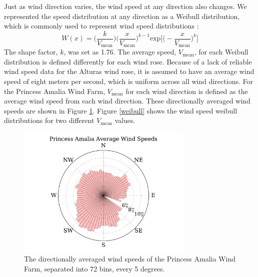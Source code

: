 Just as wind direction varies, the wind speed at any direction also changes. We represented the speed distribution at any direction as a Weibull distribution, which is commonly used to represent wind speed distributions \cite{justus1978methods,rehman1994weibull,dorvlo2002estimating}: 
\begin{equation}
W(x) = \Big(\frac{k}{V_{\text{mean}}}\Big)\Big(\frac{x}{V_{\text{mean}}}\Big)^{k-1}\text{exp}\Big[\Big(-\frac{x}{V_{\text{mean}}}\Big)^k\Big]
\end{equation}
The shape factor, $k$, was set as 1.76. The average speed, $V_{\text{mean}}$, for each Weibull distribution is defined differently for each wind rose.
Because of a lack of reliable wind speed data for the Alturas wind rose, it is assumed to have an average wind speed of eight meters per second, which is uniform across all wind directions. For the Princess Amalia Wind Farm, $V_{\text{mean}}$ for each wind direction is defined as the average wind speed from each wind direction. These directionally averaged wind speeds are shown in Figure \ref{amalia_speeds}. Figure \ref{weibull} shows the wind speed weibull distributions for two different $V_{\text{mean}}$ values. 
\begin{figure}[htbp]
  \centering
  \includegraphics[width=0.75\textwidth]{Figures/amalia_speeds.pdf}
  \caption{\label{amalia_speeds} The directionally averaged wind speeds of the Princess Amalia Wind Farm, separated into 72 bins, every 5 degrees.}
\end{figure}


